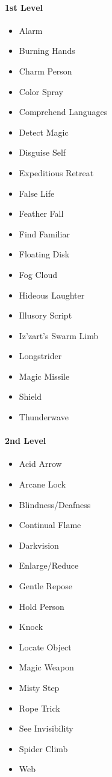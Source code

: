 \paragraph{1st Level}\label{_1st_level_3}

\begin{itemize}
\item
  Alarm
\item
  Burning Hands
\item
  Charm Person
\item
  Color Spray
\item
  Comprehend Languages
\item
  Detect Magic
\item
  Disguise Self
\item
  Expeditious Retreat
\item
  False Life
\item
  Feather Fall
\item
  Find Familiar
\item
  Floating Disk
\item
  Fog Cloud
\item
  Hideous Laughter
\item
  Illusory Script
\item
  Iz'zart's Swarm Limb
\item
  Longstrider
\item
  Magic Missile
\item
  Shield
\item
  Thunderwave
\end{itemize}

\paragraph{2nd Level}\label{_2nd_level_3}

\begin{itemize}
\item
  Acid Arrow
\item
  Arcane Lock
\item
  Blindness/Deafness
\item
  Continual Flame
\item
  Darkvision
\item
  Enlarge/Reduce
\item
  Gentle Repose
\item
  Hold Person
\item
  Knock
\item
  Locate Object
\item
  Magic Weapon
\item
  Misty Step
\item
  Rope Trick
\item
  See Invisibility
\item
  Spider Climb
\item
  Web
\end{itemize}

